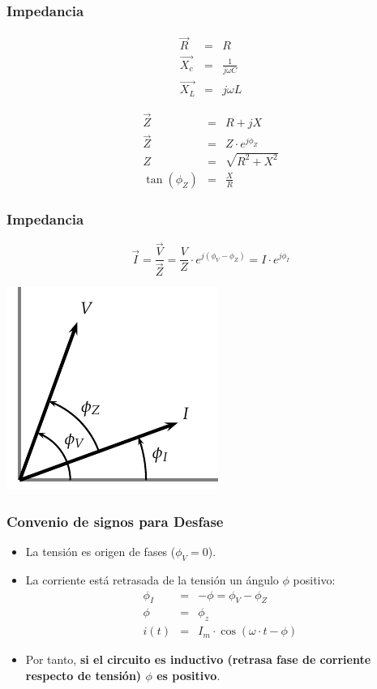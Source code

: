 \documentclass[serif, xcolor=dvipsnames]{beamer}
\begin{document}
\begin{frame}
  \frametitle{Impedancia}

\begin{eqnarray*}
  \vec{R} & = & R\\
  \vec{X_{c}} & = & \frac{1}{j\omega C}\\
  \vec{X_{L}} & = & j\omega L
\end{eqnarray*}


\begin{eqnarray*}
  \vec{Z} & = & R+jX\\
  \vec{Z} & = & Z\cdot e^{j\phi_{Z}}\\
  Z & = & \sqrt{R^{2}+X^{2}}\\
  \tan(\phi_{Z}) & = & \frac{X}{R}
\end{eqnarray*}



\end{frame}
\begin{frame}
  \frametitle{Impedancia}

\[
\vec{I}=\frac{\vec{V}}{\vec{Z}}=\frac{V}{Z}\cdot
e^{j(\phi_{V}-\phi_{Z})}=I\cdot e^{j\phi_{I}}
\]


\begin{center}
  \includegraphics{../figs/Impedancia}
  \par\end{center}


\end{frame}
\begin{frame}
  \frametitle{Convenio de signos para Desfase}
  \begin{itemize}
  \item La tensión es origen de fases ($\phi_{V}=0$).
  \item La corriente está retrasada de la tensión un ángulo $\phi$
    positivo:
    \begin{eqnarray*}
      \phi_{I} & = & -\phi=\phi_{V}-\phi_{Z}\\
      \phi & = & \phi_{z}\\
      i(t) & = & I_{m}\cdot\cos(\omega\cdot t-\phi)
    \end{eqnarray*}

  \item Por tanto, \textbf{si el circuito es inductivo (retrasa fase
      de corriente respecto de tensión) $\phi$ es positivo}.
  \end{itemize}

\end{frame}
\end{document}
